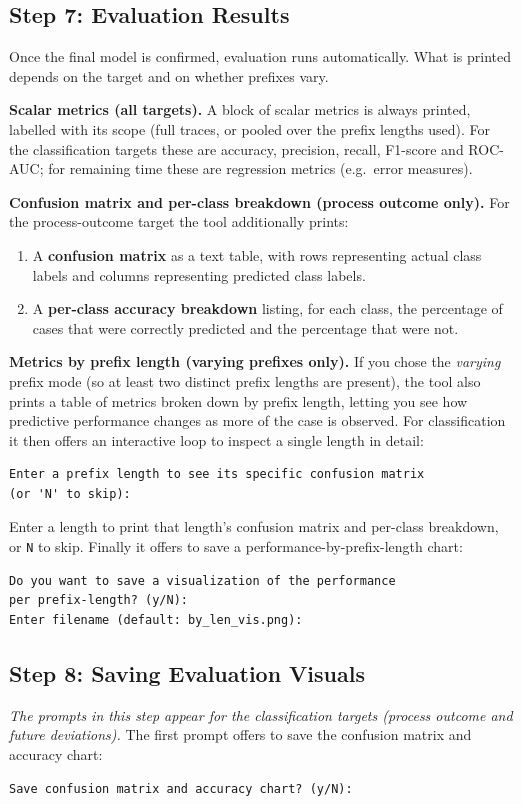 \documentclass[12pt,a4paper]{article}
\begin{document}
\subsection{Step 7: Evaluation Results}
Once the final model is confirmed, evaluation runs automatically. What is printed depends on the target and on whether prefixes vary.

\textbf{Scalar metrics (all targets).} A block of scalar metrics is always printed, labelled with its scope (full traces, or pooled over the prefix lengths used). For the classification targets these are accuracy, precision, recall, F1-score and ROC-AUC; for remaining time these are regression metrics (e.g.\ error measures).

\textbf{Confusion matrix and per-class breakdown (process outcome only).} For the process-outcome target the tool additionally prints:
\begin{enumerate}
    \item A \textbf{confusion matrix} as a text table, with rows representing actual class labels and columns representing predicted class labels.
    \item A \textbf{per-class accuracy breakdown} listing, for each class, the percentage of cases that were correctly predicted and the percentage that were not.
\end{enumerate}

\textbf{Metrics by prefix length (varying prefixes only).} If you chose the \emph{varying} prefix mode (so at least two distinct prefix lengths are present), the tool also prints a table of metrics broken down by prefix length, letting you see how predictive performance changes as more of the case is observed. For classification it then offers an interactive loop to inspect a single length in detail:
\begin{verbatim}
Enter a prefix length to see its specific confusion matrix
(or 'N' to skip):
\end{verbatim}
Enter a length to print that length's confusion matrix and per-class breakdown, or \texttt{N} to skip. Finally it offers to save a performance-by-prefix-length chart:
\begin{verbatim}
Do you want to save a visualization of the performance
per prefix-length? (y/N):
Enter filename (default: by_len_vis.png):
\end{verbatim}

\subsection{Step 8: Saving Evaluation Visuals}
\textit{The prompts in this step appear for the classification targets (process outcome and future deviations).} The first prompt offers to save the confusion matrix and accuracy chart:
\begin{verbatim}
Save confusion matrix and accuracy chart? (y/N):
\end{verbatim}
\end{document}
